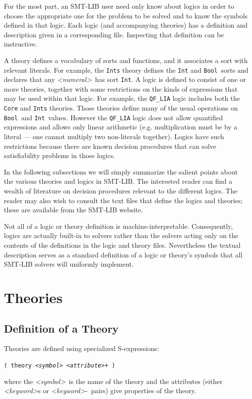 \documentclass[12pt,oneside]{report}
\newcommand{\keyword}{{\it <keyword>}}
\newcommand{\attrvalue}{{\it <attr-value>}}
\newcommand{\attribute}{{\it <attribute>}}
\newcommand{\sym}{{\it <symbol>}}
\newcommand{\numeral}{{\it <numeral>}}
\newcommand{\Bool}{{\tt Bool}}
\newcommand{\Int}{{\tt Int}}
\begin{document}
For the most part,  an SMT-LIB user need only know about logics in order to choose the appropriate one
for the problem to be solved and to know the symbols defined in that logic.  Each logic (and accompanying
theories) has a definition and description given in a corresponding file.  Inspecting that definition
can be instructive.

A theory defines a vocabulary of sorts and functions, and it associates a sort with relevant literals.
For example, the {\tt Ints} theory defines the {\tt Int} and \Bool\ sorts and declares that any \numeral~has sort \Int.
A logic is defined to consist of one or more theories, together with some restrictions on the kinds of expressions
that may be used within that logic.  For example, the {\tt QF\_LIA} logic includes both the {\tt Core} and {\tt Ints}
theories.  Those theories define many of the usual operations on \Bool\ and \Int\ values.  However the {\tt QF\_LIA}
logic does not allow quantified expressions and allows only linear arithmetic (e.g. multiplication must be by a literal ---
one cannot multiply two non-literals together). Logics have such restrictions because there are known decision procedures that
can solve satisfiability problems in those logics.

In the following subsections we will simply summarize the salient points about the various theories and logics in SMT-LIB.
The interested reader can find a wealth of literature on decision procedures relevant to the different logics.
The reader may also wish to consult the text files that define the logics and theories; these are available from the
SMT-LIB website\cite{smtlibweb}.

Not all of a logic or theory definition is machine-interpretable.  Consequently, logics are actually built-in
to solvers rather than the solvers acting only on the contents of the definitions in the logic and theory files.
Nevertheless the textual description serves as a standard definition of a logic or theory's symbols that all SMT-LIB
solvers will uniformly implement.

\section{Theories}
\label{Theories}

\subsection{Definition of a Theory}
Theories are defined using specialized S-expressions:\\
\centerline{\tt ( theory \sym~\attribute+ ) }
where the \sym~is the name of the theory and the attributes (either \keyword s or \keyword-\attrvalue\ pairs) give properties
of the theory.
\end{document}
